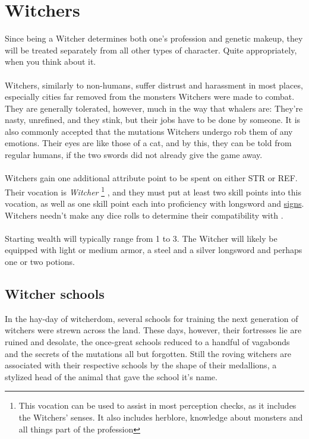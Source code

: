 \documentclass[parskip=full,11pt,%
footheight=38pt]{scrreport}
\begin{document}
\section{Witchers}
Since being a Witcher determines both one's profession and genetic makeup, they will be treated separately from all other types of character. Quite appropriately,
when you think about it.
\\\\
Witchers, similarly to non-humans, suffer distrust and harassment in most places, especially cities far removed from the monsters Witchers were
made to combat. They are generally tolerated, however, much in the way that whalers are: They're nasty, unrefined, and they stink, but their
jobs have to be done by someone. It is also commonly accepted that the mutations Witchers undergo rob them of any emotions. Their eyes are like
those of a cat, and by this, they can be told from regular humans, if the two swords did not already give the game away.
\\\\
Witchers gain one additional attribute point to be spent on either STR or REF. Their vocation is \textit{Witcher}%
\footnote{This vocation can be used to assist in most perception checks, as it includes the Witchers' senses.
	It also includes herblore, knowledge about monsters and all things part of the profession}
, and they must put at least two skill points into this vocation, as well as one skill point each into proficiency with longsword
and \hyperref[rule:signs]{signs}. Witchers needn't make any dice rolls to determine their compatibility with .
\\\\
Starting wealth will typically range from 1 to 3. The Witcher will likely be equipped with light or medium armor, a steel and a silver
longsword and perhaps one or two potions.

\subsection{Witcher schools}
In the hay-day of witcherdom, several schools for training the next generation of witchers were strewn across the land.
These days, however, their fortresses lie are ruined and desolate, the once-great schools reduced to a handful of vagabonds
and the secrets of the mutations all but forgotten. Still the roving witchers are associated with their respective schools
by the shape of their medallions, a stylized head of the animal that gave the school it's name.
\end{document}

